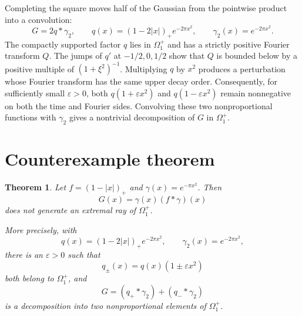 \documentclass[11pt]{article}
\newtheorem{theorem}{Theorem}
\newcommand{\Om}{\Omega_1^+}
\begin{document}
Completing the square moves half of the Gaussian from the pointwise product
into a convolution:
\[
 G=2q*\gamma_2,
 \qquad
 q(x)=(1-2|x|)_+e^{-2\pi x^2},
 \qquad
 \gamma_2(x)=e^{-2\pi x^2}.
\]
The compactly supported factor $q$ lies in $\Om$ and has a strictly positive
Fourier transform $Q$.  The jumps of $q'$ at $-1/2,0,1/2$ show that $Q$ is
bounded below by a positive multiple of $(1+\xi^2)^{-1}$.  Multiplying $q$
by $x^2$ produces a perturbation whose Fourier transform has the same upper
decay order.  Consequently, for sufficiently small $\varepsilon>0$, both
$q(1+\varepsilon x^2)$ and $q(1-\varepsilon x^2)$ remain nonnegative on both
the time and Fourier sides.  Convolving these two nonproportional functions
with $\gamma_2$ gives a nontrivial decomposition of $G$ in $\Om$.

\section*{Counterexample theorem}

\begin{theorem}
Let $f=(1-|x|)_+$ and $\gamma(x)=e^{-\pi x^2}$.  Then
\[
 G(x)=\gamma(x)(f*\gamma)(x)
\]
does not generate an extremal ray of $\Om$.

More precisely, with
\[
 q(x)=(1-2|x|)_+e^{-2\pi x^2},
 \qquad \gamma_2(x)=e^{-2\pi x^2},
\]
there is an $\varepsilon>0$ such that
\[
 q_\pm(x)=q(x)(1\pm\varepsilon x^2)
\]
both belong to $\Om$, and
\[
 G=(q_+*\gamma_2)+(q_-*\gamma_2)
\]
is a decomposition into two nonproportional elements of $\Om$.
\end{theorem}
\end{document}
